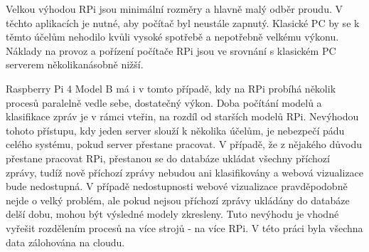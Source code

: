 Velkou výhodou RPi jsou minimální rozměry a hlavně malý odběr proudu. V těchto aplikacích je nutné, aby počítač byl neustále zapnutý. Klasické PC by se k těmto účelům nehodilo kvůli vysoké spotřebě a nepotřebně velkému výkonu. Náklady na provoz a pořízení počítače RPi jsou ve srovnání s klasickém PC serverem několikanásobně nižší. 

Raspberry Pi 4 Model B má i v tomto případě, kdy na RPi probíhá několik procesů paralelně vedle sebe, dostatečný výkon. Doba počítání modelů a klasifikace zpráv je v rámci vteřin, na rozdíl od starších modelů RPi. Nevýhodou tohoto přístupu, kdy jeden server slouží k několika účelům, je nebezpečí pádu celého systému, pokud server přestane pracovat. V případě, že z nějakého důvodu přestane pracovat RPi, přestanou se do databáze ukládat všechny příchozí zprávy, tudíž nově příchozí zprávy nebudou ani klasifikovány a webová vizualizace bude nedostupná. V případě nedostupnosti webové vizualizace pravděpodobně nejde o velký problém, ale pokud nejsou příchozí zprávy ukládány do databáze delší dobu, mohou být výsledné modely zkresleny. Tuto nevýhodu je vhodné vyřešit rozdělením procesů na více strojů - na více RPi. V této práci byla všechna data zálohována na cloudu.